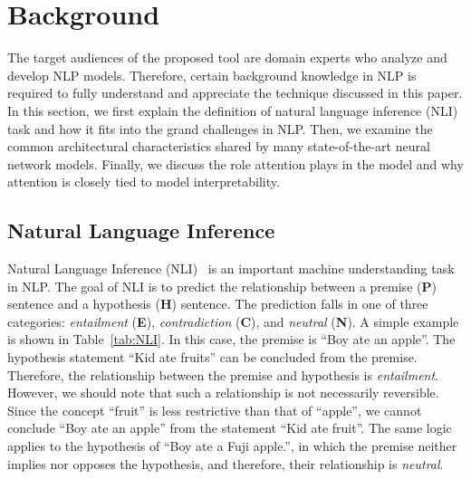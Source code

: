 \section{Background}
The target audiences of the proposed tool are domain experts who analyze and develop NLP models. Therefore, certain background knowledge in NLP is required to fully understand and appreciate the technique discussed in this paper. In this section, we first explain the definition of natural language inference (NLI) task and how it fits into the grand challenges in NLP. Then, we examine the common architectural characteristics shared by many state-of-the-art neural network models. Finally, we discuss the role attention plays in the model and why attention is closely tied to model interpretability.

\subsection{Natural Language Inference}
\label{sec:languageInference}
Natural Language Inference (NLI)~\cite{DaganRothSammons2013} is an important machine understanding task in NLP.
The goal of NLI is to predict the relationship between a premise (\textbf{P}) sentence and a hypothesis (\textbf{H}) sentence.
The prediction falls in one of three categories: \emph{entailment} (\textbf{E}), \emph{contradiction} (\textbf{C}), and \emph{neutral} (\textbf{N}).
A simple example is shown in Table~\ref{tab:NLI}.
In this case, the premise is ``Boy ate an apple''.
The hypothesis statement ``Kid ate fruits'' can be concluded from the premise. Therefore, the relationship between the premise and hypothesis is \emph{entailment}. However, we should note that such a relationship is not necessarily reversible. Since the concept ``fruit'' is less restrictive than that of ``apple'', we cannot conclude ``Boy ate an apple'' from the statement ``Kid ate fruit''. The same logic applies to the hypothesis of ``Boy ate a Fuji apple.'', in which the premise neither implies nor opposes the hypothesis, and therefore, their relationship is \emph{neutral}.

